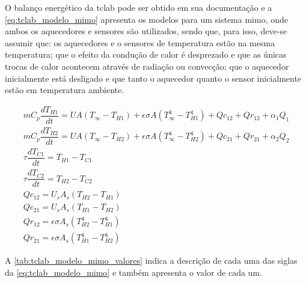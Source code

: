 O balanço energético da \acrshort{tclab} pode ser obtido em sua documentação e
a \cref{eq:tclab_modelo_mimo} apresenta os modelos
para um sistema \acrshort{mimo}, onde ambos os aquecedores e sensores são utilizados,
sendo que, para isso, deve-se assumir que: os aquecedores e o sensores de temperatura estão na
mesma temperatura; que o efeito da condução de calor é desprezado e que as únicas trocas de
calor acontecem através de radiação ou convecção; que o aquecedor inicialmente está desligado
e que tanto o aquecedor quanto o sensor inicialmente estão em temperatura ambiente.

\begin{subequations}
	\label{eq:tclab_modelo_mimo}
	\begin{gather}
		mC_p \dfrac{dT_{H1}}{dt} = UA (T_{\infty} - T_{H1}) + \epsilon \sigma A (T_{\infty}^{4} - T_{H1}^{4}) + Qc_{12} + Qr_{12} + \alpha_1 Q_1		\label{eq:tclab_modelo_mimo_a} \\
		mC_p \dfrac{dT_{H2}}{dt} = UA (T_{\infty} - T_{H2}) + \epsilon \sigma A (T_{\infty}^{4} - T_{H2}^{4}) + Qc_{21} + Qr_{21} + \alpha_2 Q_2		\label{eq:tclab_modelo_mimo_b} \\
		\tau \dfrac{dT_{C1}}{dt} = T_{H1} - T_{C1}								\\
		\tau \dfrac{dT_{C2}}{dt} = T_{H2} - T_{C2}								\\
		Qc_{12} = U_s A_s (T_{H2} - T_{H1})							\nonumber	\\
		Qc_{21} = U_s A_s (T_{H1} - T_{H2})							\nonumber	\\
		Qr_{12} = \epsilon \sigma A_s (T_{H2}^{4} - T_{H1}^{4})		\nonumber	\\
		Qr_{21} = \epsilon \sigma A_s (T_{H1}^{4} - T_{H2}^{4})		\nonumber
	\end{gather}
\end{subequations}

A \cref{tab:tclab_modelo_mimo_valores} indica a descrição de cada uma das siglas da
\cref{eq:tclab_modelo_mimo} e também apresenta o valor de cada um.

